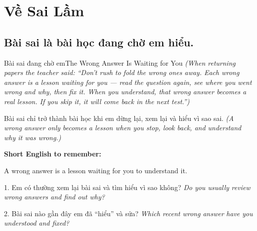 \chapter{Về Sai Lầm}

\section{Bài sai là bài học đang chờ em hiểu.}
\begin{truyen}{Bài sai đang chờ em}{The Wrong Answer Is Waiting for You}
\textit{(When returning papers the teacher said: ``Don't rush to fold the wrong ones away. Each wrong answer is a lesson waiting for you — read the question again, see where you went wrong and why, then fix it. When you understand, that wrong answer becomes a real lesson. If you skip it, it will come back in the next test.'')}
\end{truyen}

\begin{baihoc}
Bài sai chỉ trở thành bài học khi em dừng lại, xem lại và hiểu vì sao sai.
\textit{(A wrong answer only becomes a lesson when you stop, look back, and understand why it was wrong.)}
\end{baihoc}

\begin{ghinhoanh}
\textbf{Short English to remember:}

A wrong answer is a lesson waiting for you to understand it.

\end{ghinhoanh}

\begin{tuhocnhanh}
1. Em có thường xem lại bài sai và tìm hiểu vì sao không? \textit{Do you usually review wrong answers and find out why?}

2. Bài sai nào gần đây em đã ``hiểu'' và sửa? \textit{Which recent wrong answer have you understood and fixed?}
\end{tuhocnhanh}
\ngancach

